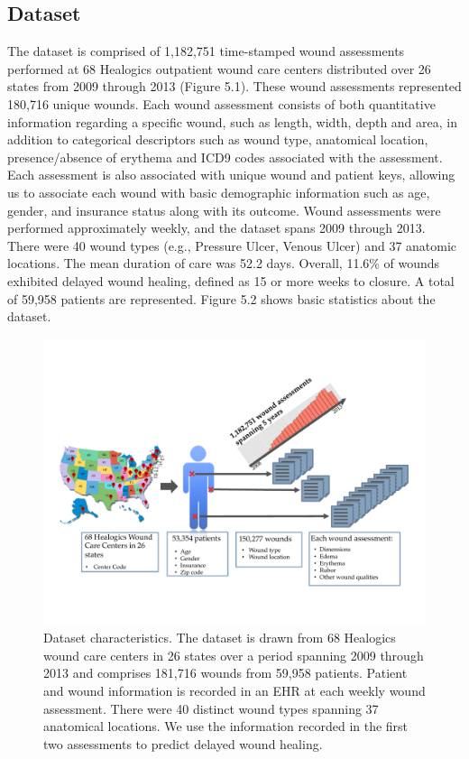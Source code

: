 \subsection{Dataset}
The dataset is comprised of 1,182,751 time-stamped wound assessments
performed at 68 Healogics outpatient wound care centers distributed
over 26 states from 2009 through 2013 (Figure 5.1).  These wound
assessments represented 180,716 unique wounds.  Each wound assessment
consists of both quantitative information regarding a specific wound,
such as length, width, depth and area, in addition to categorical
descriptors such as wound type, anatomical location, presence/absence
of erythema and ICD9 codes associated with the assessment.  Each
assessment is also associated with unique wound and patient keys,
allowing us to associate each wound with basic demographic information
such as age, gender, and insurance status along with its
outcome. Wound assessments were performed approximately weekly, and
the dataset spans 2009 through 2013.  There were 40 wound types (e.g.,
Pressure Ulcer, Venous Ulcer) and 37 anatomic locations.  The mean
duration of care was 52.2 days.  Overall, 11.6\% of wounds exhibited
delayed wound healing, defined as 15 or more weeks to closure. A total
of 59,958 patients are represented.  Figure 5.2 shows basic statistics
about the dataset.

\begin{figure}
  \begin{center}
    \includegraphics[width=0.9\linewidth]{ch5-figures/dataset_overview.pdf}
  \end{center}
  \caption[Wound healing dataset characteristics]{Dataset
    characteristics. The dataset is drawn from 68 Healogics wound care
    centers in 26 states over a period spanning 2009 through 2013 and
    comprises 181,716 wounds from 59,958 patients. Patient and wound
    information is recorded in an EHR at each weekly wound
    assessment. There were 40 distinct wound types spanning 37
    anatomical locations. We use the information recorded in the first
    two assessments to predict delayed wound healing.}
  \label{fig:short}
\end{figure}


